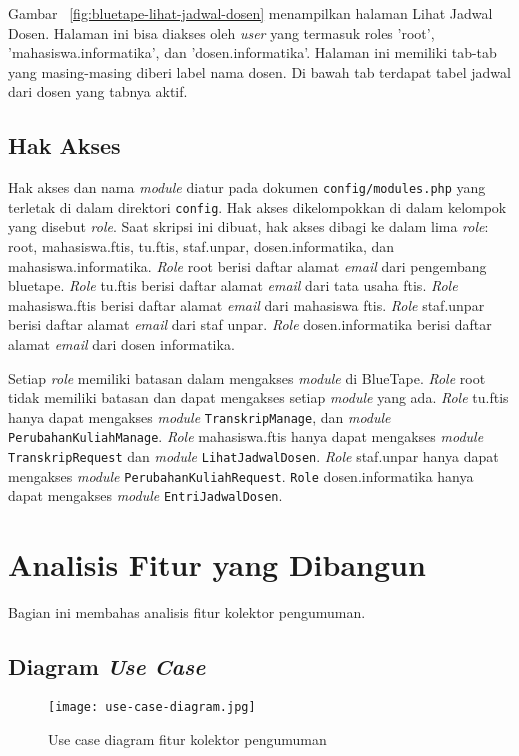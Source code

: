 	Gambar~ \ref{fig:bluetape-lihat-jadwal-dosen} menampilkan halaman Lihat Jadwal Dosen. Halaman ini bisa diakses oleh \textit{user} yang termasuk roles 'root', 'mahasiswa.informatika', dan 'dosen.informatika'. Halaman ini memiliki tab-tab yang masing-masing diberi label nama dosen. Di bawah tab terdapat tabel jadwal dari dosen yang tabnya aktif.

\subsection{Hak Akses}
	Hak akses dan nama \textit{module} diatur pada dokumen \texttt{config/modules.php} yang terletak di dalam direktori \texttt{config}. Hak akses dikelompokkan di dalam kelompok yang disebut \textit{role}. Saat skripsi ini dibuat, hak akses dibagi ke dalam lima \textit{role}: root, mahasiswa.ftis, tu.ftis, staf.unpar, dosen.informatika, dan mahasiswa.informatika. \textit{Role} root berisi daftar alamat \textit{email} dari pengembang bluetape. \textit{Role} tu.ftis berisi daftar alamat \textit{email} dari tata usaha ftis. \textit{Role} mahasiswa.ftis berisi daftar alamat \textit{email} dari mahasiswa ftis. \textit{Role} staf.unpar berisi daftar alamat \textit{email} dari staf unpar. \textit{Role} dosen.informatika berisi daftar alamat \textit{email} dari dosen informatika.

	Setiap \textit{role} memiliki batasan dalam mengakses \textit{module} di BlueTape. \textit{Role} root tidak memiliki batasan dan dapat mengakses setiap \textit{module} yang ada. \textit{Role} tu.ftis hanya dapat mengakses \textit{module} \texttt{TranskripManage}, dan \textit{module} \texttt{PerubahanKuliahManage}. \textit{Role} mahasiswa.ftis hanya dapat mengakses \textit{module} \texttt{TranskripRequest} dan \textit{module} \texttt{LihatJadwalDosen}. \textit{Role} staf.unpar hanya dapat mengakses \textit{module} \texttt{PerubahanKuliahRequest}. \texttt{Role} dosen.informatika hanya dapat mengakses \textit{module} \texttt{EntriJadwalDosen}.

\section{Analisis Fitur yang Dibangun}
\label{sec:analisisYangDibangun}
	Bagian ini membahas analisis fitur kolektor pengumuman.

\subsection{Diagram \textit{Use Case}}
\begin{figure}[H]
	\centering  
	\texttt{[image: use-case-diagram.jpg]}  
	\caption[Use case diagram fitur kolektor pengumuman]{Use case diagram fitur kolektor pengumuman} 
	\label{fig:use-case-diagram} 
\end{figure}

